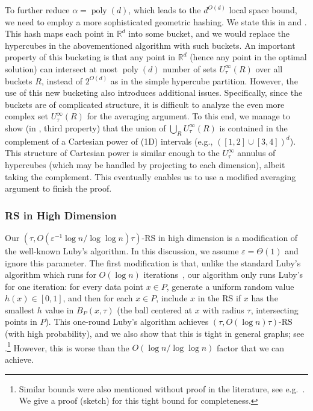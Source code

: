 \documentclass[11pt,letterpaper]{article}
\theoremstyle{plain}
\theoremstyle{definition}
\theoremstyle{remark}
\DeclareMathOperator{\poly}{poly}
\renewcommand{\epsilon}{\ensuremath{\varepsilon}}
\let\epsilon\varepsilon
\begin{document}
To further reduce $\alpha = \poly(d)$, which leads to the $d^{O(d)}$ local space bound,
we need to employ a more sophisticated geometric hashing. We state this in  and .
This hash maps each point in $\mathbb{R}^d$ into some bucket,
and we would replace the hypercubes in the abovementioned algorithm with such buckets.
An important property of this bucketing is that any point in $\mathbb{R}^d$ (hence any point in the optimal solution)
can intersect at most $\poly(d)$ number of sets $U_\tau^{\infty}(R)$ over all buckets $R$, instead of $2^{O(d)}$ as in the simple hypercube partition.
However, the use of this new bucketing also introduces additional issues.
Specifically, since the buckets are of complicated structure,
it is difficult to analyze the even more complex set $U^\infty_\tau(R)$ for the averaging argument.
To this end, we manage to show (in , third property) that the union of $\bigcup_R U^\infty_\tau(R)$
is contained in the complement of a Cartesian power of (1D) intervals (e.g., $([1, 2] \cup [3, 4])^d$).
This structure of Cartesian power is similar enough to the $U_{\tau}^{\infty}$ annulus of hypercubes (which may be handled by projecting to each dimension),
albeit taking the complement.
This eventually enables us to use a modified averaging argument to finish the proof.




\subsubsection{RS in High Dimension}
\label{sec:intro_rs}
Our $(\tau, O(\epsilon^{-1}\log n / \log\log n)\tau)$-RS in high dimension is a modification of the well-known Luby's algorithm.
In this discussion, we assume $\epsilon = \Theta(1)$ and ignore this parameter.
The first modification is that,
unlike the standard Luby's algorithm which runs for $O(\log n)$ iterations~\cite{Luby85},
our algorithm only runs Luby's for one iteration:
for every data point $x \in P$, generate a uniform random value $h(x) \in [0, 1]$,
and then for each $x\in P$, include $x$ in the RS if $x$ has the smallest $h$ value in $B_P(x, \tau)$ (the ball centered at $x$ with radius $\tau$, intersecting points in $P$). 
This one-round Luby's algorithm achieves $(\tau, O(\log n)\tau)$-RS (with high probability), and we also show that this is tight in general graphs; see .\footnote{Similar bounds were also mentioned without proof in the literature, see e.g.~\cite[Exercise 1.12]{dist_graph_book}.
We give a proof (sketch) for this tight bound for completeness.}
However, this is worse than the $O(\log n / \log \log n)$ factor that we can achieve.
\end{document}
